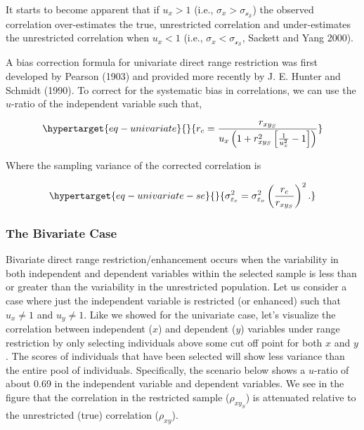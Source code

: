\documentclass[
  letterpaper,
  DIV=11,
  numbers=noendperiod]{scrreprt}
\begin{document}
It starts to become apparent that if \(u_x>1\) (i.e.,
\(\sigma_x>\sigma_\mathcal{x_S}\)) the observed correlation
over-estimates the true, unrestricted correlation and under-estimates
the unrestricted correlation when \(u_x<1\) (i.e.,
\(\sigma_x<\sigma_\mathcal{x_S}\), Sackett and Yang 2000).

A bias correction formula for univariate direct range restriction was
first developed by Pearson (1903) and provided more recently by J. E.
Hunter and Schmidt (1990). To correct for the systematic bias in
correlations, we can use the \(u\)-ratio of the independent variable
such that,

\begin{equation}\protect\hypertarget{eq-univariate}{}{
r_c = \frac{r_{xy_S}}{u_x\left(1+r_{xy_S}^2\left[\frac{1}{u^2_x}-1\right]\right)}
}\label{eq-univariate}\end{equation}

Where the sampling variance of the corrected correlation is

\begin{equation}\protect\hypertarget{eq-univariate-se}{}{
\sigma^2_{\varepsilon_c} = \sigma^2_{\varepsilon_o}\left(\frac{r_c}{r_{xy_S}}\right)^2.
}\label{eq-univariate-se}\end{equation}

\hypertarget{the-bivariate-case-2}{%
\subsubsection{The Bivariate Case}\label{the-bivariate-case-2}}

Bivariate direct range restriction/enhancement occurs when the
variability in both independent and dependent variables within the
selected sample is less than or greater than the variability in the
unrestricted population. Let us consider a case where just the
independent variable is restricted (or enhanced) such that \(u_x\neq 1\)
and \(u_y \neq 1\). Like we showed for the univariate case, let's
visualize the correlation between independent (\(x\)) and dependent
(\(y\)) variables under range restriction by only selecting individuals
above some cut off point for both \(x\) and \(y\). The scores of
individuals that have been selected will show less variance than the
entire pool of individuals. Specifically, the scenario below shows a
\(u\)-ratio of about 0.69 in the independent variable and dependent
variables. We see in the figure that the correlation in the restricted
sample (\(\rho_{xy_S}\)) is attenuated relative to the unrestricted
(true) correlation (\(\rho_{xy}\)).
\end{document}
